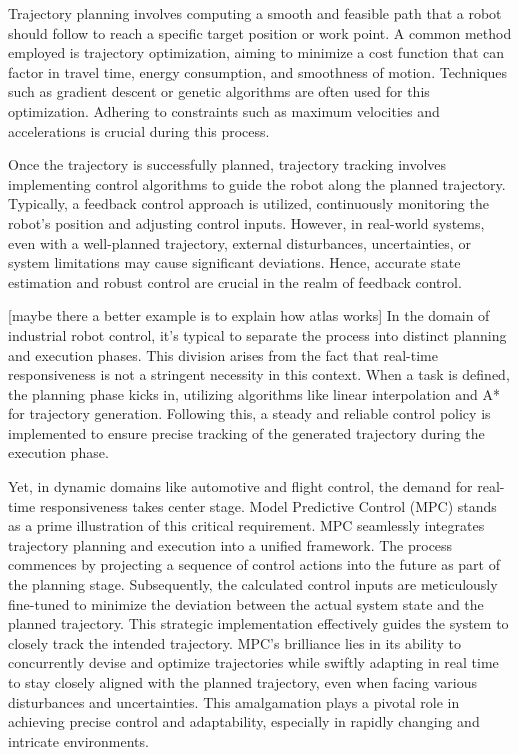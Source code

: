Trajectory planning involves computing a smooth and feasible path that a robot should follow to reach a specific target position or work point. A common method employed is trajectory optimization, aiming to minimize a cost function that can factor in travel time, energy consumption, and smoothness of motion. Techniques such as gradient descent or genetic algorithms are often used for this optimization. Adhering to constraints such as maximum velocities and accelerations is crucial during this process.

Once the trajectory is successfully planned, trajectory tracking involves implementing control algorithms to guide the robot along the planned trajectory. Typically, a feedback control approach is utilized, continuously monitoring the robot's position and adjusting control inputs. However, in real-world systems, even with a well-planned trajectory, external disturbances, uncertainties, or system limitations may cause significant deviations. Hence, accurate state estimation and robust control are crucial in the realm of feedback control.

[maybe there a better example is to explain how atlas works]
In the domain of industrial robot control, it's typical to separate the process into distinct planning and execution phases. This division arises from the fact that real-time responsiveness is not a stringent necessity in this context. When a task is defined, the planning phase kicks in, utilizing algorithms like linear interpolation and A* for trajectory generation. Following this, a steady and reliable control policy is implemented to ensure precise tracking of the generated trajectory during the execution phase.

Yet, in dynamic domains like automotive and flight control, the demand for real-time responsiveness takes center stage. Model Predictive Control (MPC) stands as a prime illustration of this critical requirement. MPC seamlessly integrates trajectory planning and execution into a unified framework. The process commences by projecting a sequence of control actions into the future as part of the planning stage. Subsequently, the calculated control inputs are meticulously fine-tuned to minimize the deviation between the actual system state and the planned trajectory. This strategic implementation effectively guides the system to closely track the intended trajectory. MPC's brilliance lies in its ability to concurrently devise and optimize trajectories while swiftly adapting in real time to stay closely aligned with the planned trajectory, even when facing various disturbances and uncertainties. This amalgamation plays a pivotal role in achieving precise control and adaptability, especially in rapidly changing and intricate environments.

